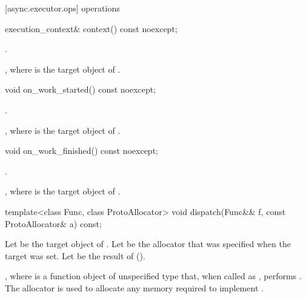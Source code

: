 [async.executor.ops]{ operations}

%
\begin{itemdecl}
execution_context& context() const noexcept;
\end{itemdecl}

\begin{itemdescr}
\pnum
\requires {}.

\pnum
\returns {}, where  is the target object of .
\end{itemdescr}

%
\begin{itemdecl}
void on_work_started() const noexcept;
\end{itemdecl}

\begin{itemdescr}
\pnum
\requires {}.

\pnum
\effects {}, where  is the target object of .
\end{itemdescr}

%
\begin{itemdecl}
void on_work_finished() const noexcept;
\end{itemdecl}

\begin{itemdescr}
\pnum
\requires {}.

\pnum
\effects {}, where  is the target object of .
\end{itemdescr}

%
\begin{itemdecl}
template<class Func, class ProtoAllocator>
  void dispatch(Func&& f, const ProtoAllocator& a) const;
\end{itemdecl}

\begin{itemdescr}
\pnum
Let  be the target object of . Let  be the allocator that was specified when the target was set. Let  be the result of  ().

\pnum
\effects {}, where  is a function object of unspecified type that, when called as , performs . The allocator  is used to allocate any memory required to implement .
\end{itemdescr}


